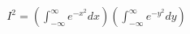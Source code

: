 \documentclass[preview]{standalone}
\begin{document}
\begin{align*}
I^2 = \left(\int_{-\infty}^{\infty} e^{-x^2} dx\right) \left(\int_{-\infty}^{\infty} e^{-y^2} dy\right)
\end{align*}
\end{document}
